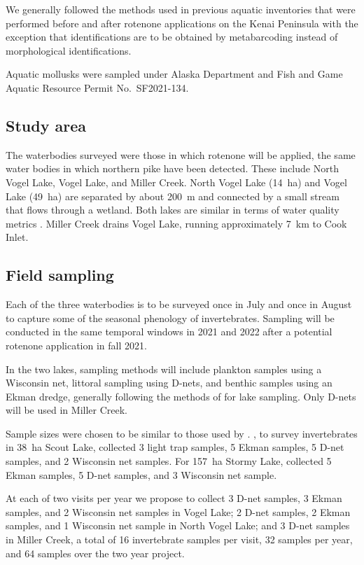 We generally followed the methods used in previous aquatic inventories that were performed before and after rotenone applications on the Kenai Peninsula \citep{Massengill2014, Massengill2017} with the exception that identifications are to be obtained by metabarcoding instead of morphological identifications.

Aquatic mollusks were sampled under Alaska Department and Fish and Game Aquatic Resource Permit No.\ SF2021-134.

\subsection{Study area}

The waterbodies surveyed were those in which rotenone will be applied, the same water bodies in which northern pike have been detected. These include North Vogel Lake, Vogel Lake, and Miller Creek. North Vogel Lake (14~ha) and Vogel Lake (49~ha) are separated by about 200~m and connected by a small stream that flows through a wetland. Both lakes are similar in terms of water quality metrics \citep{Meyer2021}. Miller Creek drains Vogel Lake, running approximately 7~km to Cook Inlet.

\subsection{Field sampling}

Each of the three waterbodies is to be surveyed once in July and once in August to capture some of the seasonal phenology of invertebrates. Sampling will be conducted in the same temporal windows in 2021 and 2022 after a potential rotenone application in fall 2021.

In the two lakes, sampling methods will include plankton samples using a Wisconsin net, littoral sampling using D-nets, and benthic samples using an Ekman dredge, generally following the methods of \citet{Massengill2014, Massengill2017} for lake sampling. Only D-nets will be used in Miller Creek.

Sample sizes were chosen to be similar to those used by \citet{Massengill2014, Massengill2017}. \citet{Massengill2014}, to survey invertebrates in 38~ha Scout Lake, collected 3 light trap samples, 5 Ekman samples, 5 D-net samples, and 2 Wisconsin net samples. For 157~ha Stormy Lake, \citet{Massengill2014, Massengill2017} collected 5 Ekman samples, 5 D-net samples, and 3 Wisconsin net sample.

At each of two visits per year we propose to collect 3 D-net samples, 3 Ekman samples, and 2 Wisconsin net samples in Vogel Lake; 2 D-net samples, 2 Ekman samples, and 1 Wisconsin net sample in North Vogel Lake; and 3 D-net samples in Miller Creek, a total of 16 invertebrate samples per visit, 32 samples per year, and 64 samples over the two year project. 



